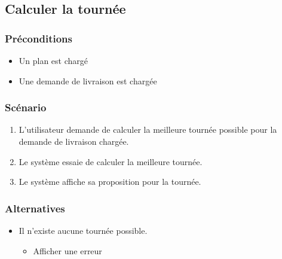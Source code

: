 \subsection{Calculer la tournée}\hypertarget{calculer-la-tourne}{}\label{calculer-la-tourne}

\subsubsection{Préconditions}\hypertarget{prconditions}{}\label{prconditions}

\begin{itemize}
\item Un plan est chargé
\item Une demande de livraison est chargée
\end{itemize}

\subsubsection{Scénario}\hypertarget{scnario}{}\label{scnario}

\begin{enumerate}
\item L'utilisateur demande de calculer la meilleure tournée possible pour la demande
de livraison chargée.
\item Le système essaie de calculer la meilleure tournée.
\item Le système affiche sa proposition pour la tournée.
\end{enumerate}

\subsubsection{Alternatives}\hypertarget{alternatives}{}\label{alternatives}

\begin{itemize}
\item Il n'existe aucune tournée possible.


\begin{itemize}
\item Afficher une erreur
\end{itemize}
\end{itemize}
